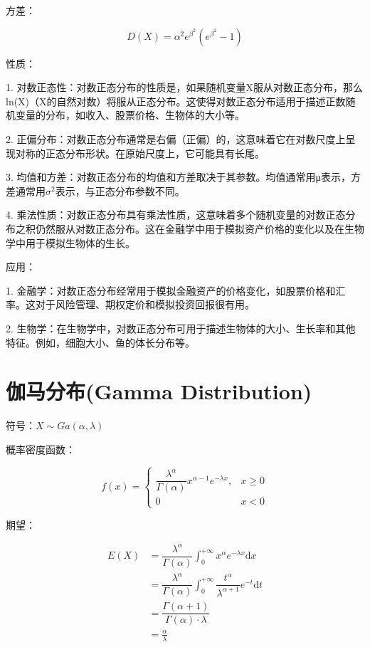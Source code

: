 \documentclass[12pt, a4paper, oneside]{ctexbook}
\begin{document}
 方差：

$$
D(X) = \alpha^{2}e^{\beta^{2}}(e^{\beta^{2}} - 1)
$$

 性质：

1. 对数正态性：对数正态分布的性质是，如果随机变量X服从对数正态分布，那么ln(X)（X的自然对数）将服从正态分布。这使得对数正态分布适用于描述正数随机变量的分布，如收入、股票价格、生物体的大小等。

2. 正偏分布：对数正态分布通常是右偏（正偏）的，这意味着它在对数尺度上呈现对称的正态分布形状。在原始尺度上，它可能具有长尾。

3. 均值和方差：对数正态分布的均值和方差取决于其参数。均值通常用μ表示，方差通常用$σ^2$表示，与正态分布参数不同。

4. 乘法性质：对数正态分布具有乘法性质，这意味着多个随机变量的对数正态分布之积仍然服从对数正态分布。这在金融学中用于模拟资产价格的变化以及在生物学中用于模拟生物体的生长。

 应用：

1. 金融学：对数正态分布经常用于模拟金融资产的价格变化，如股票价格和汇率。这对于风险管理、期权定价和模拟投资回报很有用。

2. 生物学：在生物学中，对数正态分布可用于描述生物体的大小、生长率和其他特征。例如，细胞大小、鱼的体长分布等。

\section{伽马分布(Gamma Distribution)}

 符号：$X \sim Ga(\alpha, \lambda)$

 概率密度函数：

$$
f(x) = \begin{cases}
\dfrac{\lambda^{\alpha}}{\Gamma(\alpha)} x^{\alpha - 1}e^{-\lambda x}, &x \geq 0\\
0 & x < 0
\end{cases}
$$

 期望：

$$
\begin{aligned}
E(X) &= \dfrac{\lambda^{\alpha}}{\Gamma(\alpha)}\int_{0}^{+\infty} x^{\alpha} e^{-\lambda x} \mathrm{d}x \\ &= \dfrac{\lambda^{\alpha}}{\Gamma(\alpha)} \int_{0}^{+\infty} \dfrac{t^{\alpha}}{\lambda ^{\alpha + 1}}e^{-t} \mathrm{d}t \\
&= \dfrac{\Gamma(\alpha  +1)}{\Gamma(\alpha) \cdot \lambda} \\
&= \frac{\alpha}{\lambda}
\end{aligned}
$$
\end{document}
